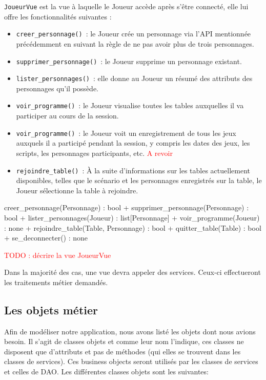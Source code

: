 \documentclass[11pt]{article}
\begin{document}
\texttt{JoueurVue} est la vue à laquelle le Joueur accède après s'être connecté, elle lui offre les fonctionnalités suivantes :
\begin{itemize}[label=, font=\small]
    \item\texttt{creer\_personnage()}~: le Joueur crée un personnage via l'API mentionnée précédemment en suivant la règle de ne pas avoir plus de trois personnages.
    \item\texttt{supprimer\_personnage()}~: le Joueur supprime un personnage existant.
    \item\texttt{lister\_personnages()}~: elle donne au Joueur un résumé des attributs des personnages qu'il possède.
    \item\texttt{voir\_programme()}~: le Joueur visualise toutes les tables auxquelles il va participer au cours de la session.
    \item\texttt{voir\_programme()}~: le Joueur voit un enregistrement de tous les jeux auxquels il a participé pendant la session, y compris les dates des jeux, les scripts, les personnages participants, etc. \textcolor{red}{A revoir}
    \item\texttt{rejoindre\_table()}~: À la suite d'informations sur les tables actuellement disponibles, telles que le scénario et les personnages enregistrés sur la table, le Joueur sélectionne la table à rejoindre.
\end{itemize}



creer\_personnage(Personnage) : bool
+ supprimer\_personnage(Personnage) : bool
+ lister\_personnages(Joueur) : list[Personnage]
+ voir\_programme(Joueur) : none
+ rejoindre\_table(Table, Personnage) : bool
+ quitter\_table(Table) : bool
+ se\_deconnecter() : none






\textcolor{red}{TODO : décrire la vue JoueurVue}






\bigbreak
Dans la majorité des cas, une vue devra appeler des services. Ceux-ci effectueront les traitements métier demandés.


\subsection{Les objets métier}

Afin de modéliser notre application, nous avons listé les objets dont nous avions besoin. Il s’agit de classes objets et comme leur nom l’indique, ces classes ne disposent que d’attributs et pas de méthodes (qui elles se trouvent dans les classes de services). Ces business objects seront utilisés par les classes de services et celles de DAO. Les différentes classes objets sont les suivantes:
\end{document}
